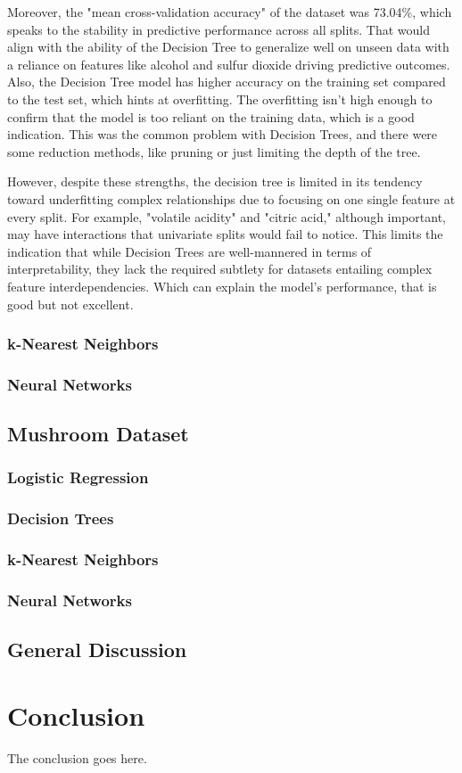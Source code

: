\documentclass[conference]{IEEEtran}
\begin{document}
Moreover, the "mean cross-validation accuracy" of the dataset was 73.04\%, which speaks to the stability in predictive performance across all splits. That would align with the ability of the Decision Tree to generalize well on unseen data with a reliance on features like alcohol and sulfur dioxide driving predictive outcomes. Also, the Decision Tree model has higher accuracy on the training set compared to the test set, which hints at overfitting. The overfitting isn't high enough to confirm that the model is too reliant on the training data, which is a good indication. This was the common problem with Decision Trees, and there were some reduction methods, like pruning or just limiting the depth of the tree.

However, despite these strengths, the decision tree is limited in its tendency toward underfitting complex relationships due to focusing on one single feature at every split. For example, "volatile acidity" and "citric acid," although important, may have interactions that univariate splits would fail to notice. This limits the indication that while Decision Trees are well-mannered in terms of interpretability, they lack the required subtlety for datasets entailing complex feature interdependencies. Which can explain the model's performance, that is good but not excellent.

\subsubsection{k-Nearest Neighbors}
\subsubsection{Neural Networks}

\subsection{Mushroom Dataset}
\subsubsection{Logistic Regression}
\subsubsection{Decision Trees}
\subsubsection{k-Nearest Neighbors}
\subsubsection{Neural Networks}

\subsection{General Discussion}

\section{Conclusion}
The conclusion goes here.

\nocite{*}
\def\BibTeX{BibTeX}


\end{document}
